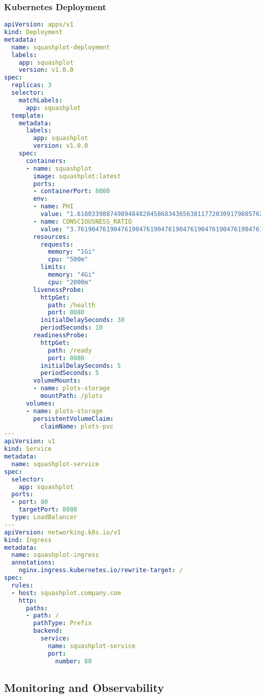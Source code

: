 \documentclass[11pt,a4paper]{article}
\begin{document}
\subsubsection{Kubernetes Deployment}

\begin{lstlisting}[language=YAML, caption=Kubernetes Production Deployment]
apiVersion: apps/v1
kind: Deployment
metadata:
  name: squashplot-deployment
  labels:
    app: squashplot
    version: v1.0.0
spec:
  replicas: 3
  selector:
    matchLabels:
      app: squashplot
  template:
    metadata:
      labels:
        app: squashplot
        version: v1.0.0
    spec:
      containers:
      - name: squashplot
        image: squashplot:latest
        ports:
        - containerPort: 8080
        env:
        - name: PHI
          value: "1.6180339887498948482045868343656381177203091798057628621354486227052604628189024497072072041893911374847540880753868917521266338622235369317931800607667263544333890865959395829056383226613199282902678806752087668925017116962070322210432162695486262963136144"
        - name: CONSCIOUSNESS_RATIO
          value: "3.7619047619047619047619047619047619047619047619047619047619047619047619047619047619047619047619047619047619047619047619047619047619047619047619047619"
        resources:
          requests:
            memory: "1Gi"
            cpu: "500m"
          limits:
            memory: "4Gi"
            cpu: "2000m"
        livenessProbe:
          httpGet:
            path: /health
            port: 8080
          initialDelaySeconds: 30
          periodSeconds: 10
        readinessProbe:
          httpGet:
            path: /ready
            port: 8080
          initialDelaySeconds: 5
          periodSeconds: 5
        volumeMounts:
        - name: plots-storage
          mountPath: /plots
      volumes:
      - name: plots-storage
        persistentVolumeClaim:
          claimName: plots-pvc
---
apiVersion: v1
kind: Service
metadata:
  name: squashplot-service
spec:
  selector:
    app: squashplot
  ports:
  - port: 80
    targetPort: 8080
  type: LoadBalancer
---
apiVersion: networking.k8s.io/v1
kind: Ingress
metadata:
  name: squashplot-ingress
  annotations:
    nginx.ingress.kubernetes.io/rewrite-target: /
spec:
  rules:
  - host: squashplot.company.com
    http:
      paths:
      - path: /
        pathType: Prefix
        backend:
          service:
            name: squashplot-service
            port:
              number: 80
\end{lstlisting}

\subsection{Monitoring and Observability}
\end{document}
